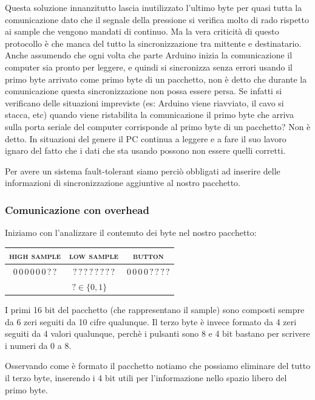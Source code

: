 \documentclass[a4paper,11pt]{article}
\begin{document}
Questa soluzione innanzitutto lascia inutilizzato l'ultimo byte per quasi tutta la comunicazione dato che il segnale della pressione si verifica molto di rado rispetto ai sample che vengono mandati di continuo. Ma la vera criticità di questo protocollo è che manca del tutto la sincronizzazione tra mittente e destinatario. Anche assumendo che ogni volta che parte Arduino inizia la comunicazione il computer sia pronto per leggere, e quindi si sincronizza senza errori usando il primo byte arrivato come primo byte di un pacchetto, non è detto che durante la comunicazione questa sincronizzazione non possa essere persa. Se infatti si verificano delle situazioni impreviste (es: Arduino viene riavviato, il cavo si stacca, etc) quando viene ristabilita la comunicazione il primo byte che arriva sulla porta seriale del computer corrisponde al primo byte di un pacchetto? Non è detto. In situazioni del genere il PC continua a leggere e a fare il suo lavoro ignaro del fatto che i dati che sta usando possono non essere quelli corretti.

Per avere un sistema fault-tolerant siamo perciò obbligati ad inserire delle informazioni di sincronizzazione aggiuntive al nostro pacchetto.

\subsubsection{Comunicazione con overhead}
Iniziamo con l'analizzare il contenuto dei byte nel nostro pacchetto:

\begin{table}[h]
\begin{tabular}{ccc}
\textsc{high sample}           & \textsc{low sample}           & \textsc{button}                             \\ \hline
\multicolumn{1}{|c|}{$0\, 0\, 0\, 0\, 0\, 0\, ?\, ? $} & \multicolumn{1}{c|}{$?\,?\,?\,?\,?\,?\,?\,?$} & \multicolumn{1}{c|}{$0\,0\,0\,0\,?\,?\,?\,?$} \\ \hline
\multicolumn{3}{c}{$? \in \{0, 1\}$} 
\end{tabular}
\end{table}

I primi 16 bit del pacchetto (che rappresentano il sample) sono composti sempre da 6 zeri seguiti da 10 cifre qualunque. Il terzo byte è invece formato da 4 zeri seguiti da 4 valori qualunque, perchè i pulsanti sono 8 e 4 bit bastano per scrivere i numeri da 0 a 8.

Osservando come è formato il pacchetto notiamo che possiamo eliminare del tutto il terzo byte, inserendo i 4 bit utili per l'informazione nello spazio libero del primo byte.
\end{document}
